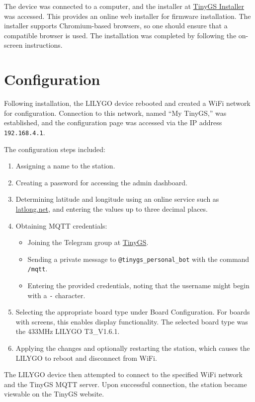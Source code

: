 \documentclass{article}
\begin{document}
The device was connected to a computer, and the installer at \href{http://installer.tinygs.com}{TinyGS Installer} was accessed. This provides an online web installer for firmware installation. The installer supports Chromium-based browsers, so one should ensure that a compatible browser is used. The installation was completed by following the on-screen instructions.

\section{Configuration}
Following installation, the LILYGO device rebooted and created a WiFi network for configuration. Connection to this network, named ``My TinyGS,'' was established, and the configuration page was accessed via the IP address \texttt{192.168.4.1}.

The configuration steps included:
\begin{enumerate}
    \item Assigning a name to the station.
    \item Creating a password for accessing the admin dashboard.
    \item Determining latitude and longitude using an online service such as \href{http://latlong.net}{latlong.net}, and entering the values up to three decimal places.
    \item Obtaining MQTT credentials:
    \begin{itemize}
        \item Joining the Telegram group at \href{https://tinygs.com}{TinyGS}.
        \item Sending a private message to \texttt{@tinygs\_personal\_bot} with the command \texttt{/mqtt}.
        \item Entering the provided credentials, noting that the username might begin with a \texttt{-} character.
    \end{itemize}
    \item Selecting the appropriate board type under Board Configuration. For boards with screens, this enables display functionality. The selected board type was the 433MHz LILYGO T3\_V1.6.1.
    \item Applying the changes and optionally restarting the station, which causes the LILYGO to reboot and disconnect from WiFi.
\end{enumerate}

The LILYGO device then attempted to connect to the specified WiFi network and the TinyGS MQTT server. Upon successful connection, the station became viewable on the TinyGS website.
\end{document}
